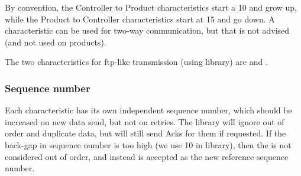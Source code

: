 By convention, the Controller to Product characteristics start a 10 and grow up, while the Product to Controller characteristics start at 15 and go down. A characteristic can be used for two-way communication, but that is not advised (and not used on products).


The two characteristics for ftp-like transmission (using  library) are  and .


\subsubsection{Sequence number}

Each characteristic has its own independent sequence number, which should be increased on new data send, but not on retries. The  library will ignore out of order and duplicate data, but will still send Acks for them if requested. If the back-gap in sequence number is too high (we use 10 in  library), then the  is not considered out of order, and instead is accepted as the new reference sequence number.

